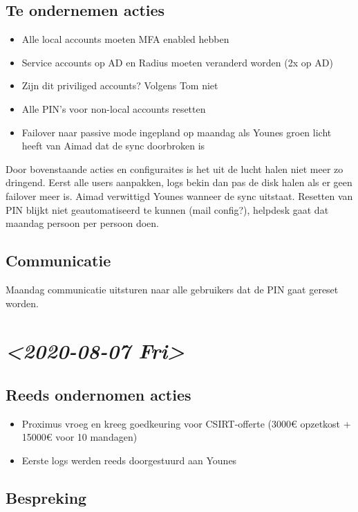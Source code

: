 \documentclass[11pt]{article}
\begin{document}
\subsection{Te ondernemen acties}
\label{sec:org0f625a0}
\begin{itemize}
\item Alle local accounts moeten MFA enabled hebben
\item Service accounts op AD en Radius moeten veranderd worden (2x op AD)
\item Zijn dit priviliged accounts? Volgens Tom niet
\item Alle PIN's voor non-local accounts resetten
\item Failover naar passive mode ingepland op maandag als Younes groen licht heeft van Aimad dat de sync doorbroken is
\end{itemize}

Door bovenstaande acties en configuraites is het uit de lucht halen niet meer zo dringend. Eerst alle users aanpakken, logs bekin dan pas de disk halen als er geen failover meer is. Aimad verwittigd Younes wanneer de sync uitstaat. Resetten van PIN blijkt niet geautomatiseerd te kunnen (mail config?), helpdesk gaat dat maandag persoon per persoon doen.

\subsection{Communicatie}
\label{sec:org8c7a1e8}

Maandag communicatie uitsturen naar alle gebruikers dat de PIN gaat gereset worden.

\section{\textit{<2020-08-07 Fri>}}
\label{sec:orgec4d4c0}

\subsection{Reeds ondernomen acties}
\label{sec:org1b5d302}
\begin{itemize}
\item Proximus vroeg en kreeg goedkeuring voor CSIRT-offerte (3000€ opzetkost + 15000€ voor 10 mandagen)
\item Eerste logs werden reeds doorgestuurd aan Younes
\end{itemize}

\subsection{Bespreking}
\label{sec:org5dc3d25}
\end{document}
